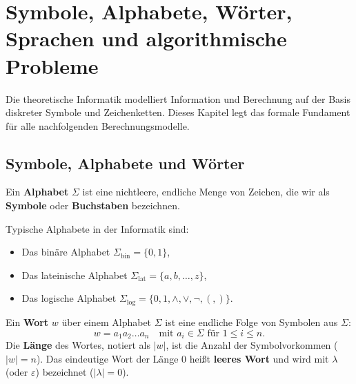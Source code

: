 \section{Symbole, Alphabete, Wörter, Sprachen und algorithmische Probleme}

Die theoretische Informatik modelliert Information und Berechnung auf der Basis diskreter Symbole und Zeichenketten. Dieses Kapitel legt das formale Fundament für alle nachfolgenden Berechnungsmodelle.

\subsection{Symbole, Alphabete und Wörter}

\begin{definition}
    Ein \textbf{Alphabet} $\Sigma$ ist eine nichtleere, endliche Menge von Zeichen, die wir als \textbf{Symbole} oder \textbf{Buchstaben} bezeichnen.
\end{definition}

\begin{beispiel}[Standardalphabete]
    Typische Alphabete in der Informatik sind:
    \begin{itemize}
        \item Das binäre Alphabet $\Sigma_{\mathrm{bin}} = \{0, 1\}$,
        \item Das lateinische Alphabet $\Sigma_{\mathrm{lat}} = \{a, b, \dots, z\}$,
        \item Das logische Alphabet $\Sigma_{\mathrm{log}} = \{0, 1, \land, \lor, \neg, (, )\}$.
    \end{itemize}
\end{beispiel}

\begin{definition}
    Ein \textbf{Wort} $w$ über einem Alphabet $\Sigma$ ist eine endliche Folge von Symbolen aus $\Sigma$:
    \[
        w = a_1 a_2 \dots a_n \quad \text{mit } a_i \in \Sigma \text{ für } 1 \le i \le n.
    \]
    Die \textbf{Länge} des Wortes, notiert als $|w|$, ist die Anzahl der Symbolvorkommen ($|w| = n$).
    Das eindeutige Wort der Länge 0 heißt \textbf{leeres Wort} und wird mit $\lambda$ (oder $\varepsilon$) bezeichnet ($|\lambda| = 0$).
\end{definition}

